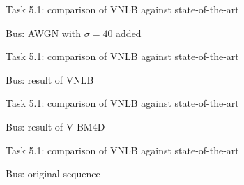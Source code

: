 \documentclass[mathserif, 8pt]{beamer}
\makeatletter
\newcounter{multipleslide}
\newcommand{\multipleframe}{%
\setcounter{multipleslide}{\value{framenumber}}
\stepcounter{multipleslide}
\patchcmd{\beamer@@tmpl@footline}%
	{\insertframenumber}%
	{\themultipleslide}%
	{}%
	{}%
}
\newcommand{\restoreframe}{%
\patchcmd{\beamer@@tmpl@footline}%
	{\themultipleslide}%
	{\insertframenumber}%
	{}%
	{}%
\setcounter{framenumber}{\value{multipleslide}}%
}
\makeatother
\begin{document}
\multipleframe
\begin{frame}{Task 5.1: comparison of VNLB against state-of-the-art}

	\begin{center}
	\end{center}
	\begin{center}
			Bus: AWGN with $\sigma = 40$ added
	\end{center}
\end{frame}

\begin{frame}{Task 5.1: comparison of VNLB against state-of-the-art}
	\begin{center}
	\end{center}
	\begin{center}
			Bus: result of VNLB  
	\end{center}
\end{frame}

\begin{frame}{Task 5.1: comparison of VNLB against state-of-the-art}
	\begin{center}
	\end{center}
	\begin{center}
			Bus: result of V-BM4D
	\end{center}
\end{frame}

\begin{frame}{Task 5.1: comparison of VNLB against state-of-the-art}
	\begin{center}
	\end{center}
	\begin{center}
			Bus: original sequence
	\end{center}
\end{frame}
\restoreframe
\end{document}
